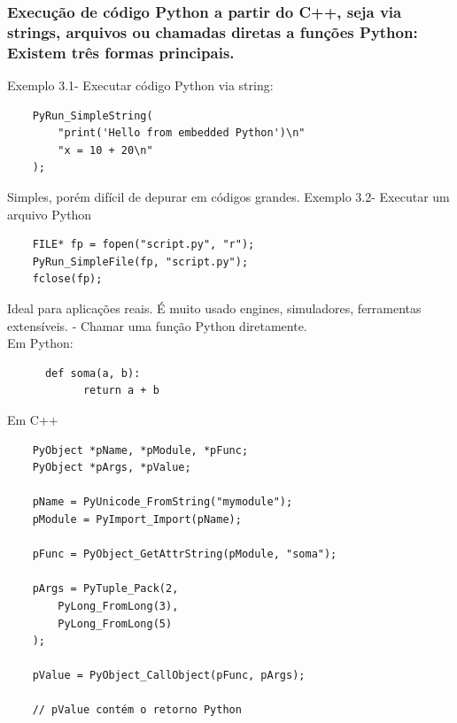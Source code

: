     \subsubsection { Execução de código Python a partir do C++, seja via strings, arquivos ou chamadas diretas a funções Python: Existem três formas principais.}

   Exemplo 3.1- Executar código Python via string:
     \begin{verbatim}
    PyRun_SimpleString(
        "print('Hello from embedded Python')\n"
        "x = 10 + 20\n"
    );
     \end{verbatim}
    Simples, porém difícil de depurar em códigos grandes.
    \newline\newline
    Exemplo 3.2- Executar um arquivo Python
    \begin{verbatim}
    FILE* fp = fopen("script.py", "r");
    PyRun_SimpleFile(fp, "script.py");
    fclose(fp);
    \end{verbatim} 
    Ideal para aplicações reais. É muito usado engines, simuladores, ferramentas extensíveis.
    \newline{}- Chamar uma função Python diretamente.\\
     Em Python:
     \begin{verbatim}
      def soma(a, b):
            return a + b
     \end{verbatim} 
     Em C++
      \begin{verbatim}
    PyObject *pName, *pModule, *pFunc;
    PyObject *pArgs, *pValue;

    pName = PyUnicode_FromString("mymodule");
    pModule = PyImport_Import(pName);

    pFunc = PyObject_GetAttrString(pModule, "soma");

    pArgs = PyTuple_Pack(2,
        PyLong_FromLong(3),
        PyLong_FromLong(5)
    );
    
    pValue = PyObject_CallObject(pFunc, pArgs);
    
    // pValue contém o retorno Python
    
      \end{verbatim} 
     
